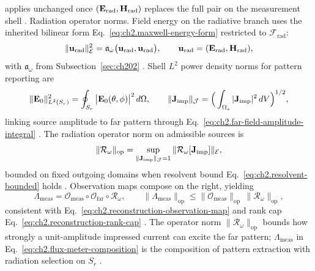 applies unchanged once \((\mathbf{E}_{\mathrm{rad}},\mathbf{H}_{\mathrm{rad}})\) replaces the full pair on
the measurement shell \cite{stratton1941}.
Radiation operator norms. Field energy on the radiative branch uses the inherited bilinear form
Eq.~\eqref{eq:ch2.maxwell-energy-form} restricted to \(\mathcal{F}_{\mathrm{rad}}\):
\begin{equation}
\label{eq:ch2.radiation-energy-norm}
\|\mathbf{u}_{\mathrm{rad}}\|_{\mathcal{E}}^{2}
=
\mathfrak{a}_\omega\big(\mathbf{u}_{\mathrm{rad}},\mathbf{u}_{\mathrm{rad}}\big),
\qquad
\mathbf{u}_{\mathrm{rad}}=(\mathbf{E}_{\mathrm{rad}},\mathbf{H}_{\mathrm{rad}}),
\end{equation}
with \(\mathfrak{a}_\omega\) from Subsection~\ref{sec:ch202} \cite{stratton1941}. Shell
\(L^{2}\) power density norms for pattern reporting are
\begin{equation}
\label{eq:ch2.radiation-pattern-norm}
\|\mathbf{E}_0\|_{L^{2}(S_r)}^{2}
=
\oint_{S_r}\big|\mathbf{E}_0(\theta,\phi)\big|^{2}\,d\Omega,
\qquad
\|\mathbf{J}_{\mathrm{imp}}\|_{\mathcal{J}}=\Big(\int_{\Omega_s}|\mathbf{J}_{\mathrm{imp}}|^{2}\,dV\Big)^{1/2},
\end{equation}
linking source amplitude to far pattern through
Eq.~\eqref{eq:ch2.far-field-amplitude-integral} \cite{harrington2001}. The
radiation operator norm on admissible sources is
\begin{equation}
\label{eq:ch2.radiation-operator-norm}
\|\mathcal{R}_\omega\|_{\mathrm{op}}
=
\sup_{\|\mathbf{J}_{\mathrm{imp}}\|_{\mathcal{J}}=1}
\|\mathcal{R}_\omega[\mathbf{J}_{\mathrm{imp}}]\|_{\mathcal{E}},
\end{equation}
bounded on fixed outgoing domains when resolvent bound
Eq.~\eqref{eq:ch2.resolvent-bounded} holds \cite{stratton1941}. Observation
maps compose on the right, yielding
\begin{equation}
\label{eq:ch2.flux-meter-composition}
\Lambda_{\mathrm{meas}}
=
\mathcal{O}_{\mathrm{meas}}\circ\mathcal{O}_{\mathrm{far}}\circ\mathcal{R}_\omega,
\qquad
\|\Lambda_{\mathrm{meas}}\|_{\mathrm{op}}
\le
\|\mathcal{O}_{\mathrm{meas}}\|_{\mathrm{op}}\,
\|\mathcal{R}_\omega\|_{\mathrm{op}},
\end{equation}
consistent with Eq.~\eqref{eq:ch2.reconstruction-observation-map} and rank cap
Eq.~\eqref{eq:ch2.reconstruction-rank-cap} \cite{stratton1941}. The operator norm
$\|\mathcal{R}_\omega\|_{\mathrm{op}}$ bounds how strongly a unit-amplitude impressed
current can excite the far pattern; $\Lambda_{\mathrm{meas}}$ in
Eq.~\eqref{eq:ch2.flux-meter-composition} is the composition of pattern extraction with
radiation selection on $S_r$ \cite{harrington2001}.
\label{prop:ch2.far-zone-flux-stabilization}
